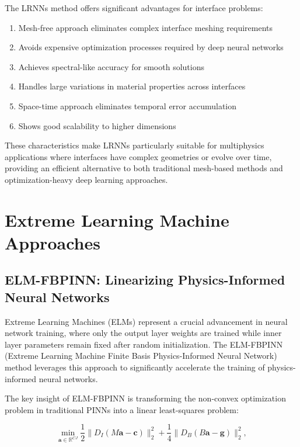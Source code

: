 \documentclass[11pt]{article}
\begin{document}
The LRNNs method offers significant advantages for interface problems:
\begin{enumerate}
    \item Mesh-free approach eliminates complex interface meshing requirements
    \item Avoids expensive optimization processes required by deep neural networks
    \item Achieves spectral-like accuracy for smooth solutions
    \item Handles large variations in material properties across interfaces
    \item Space-time approach eliminates temporal error accumulation
    \item Shows good scalability to higher dimensions
\end{enumerate}

These characteristics make LRNNs particularly suitable for multiphysics applications where interfaces have complex geometries or evolve over time, providing an efficient alternative to both traditional mesh-based methods and optimization-heavy deep learning approaches.

\section{Extreme Learning Machine Approaches}

\subsection{ELM-FBPINN: Linearizing Physics-Informed Neural Networks}

Extreme Learning Machines (ELMs) represent a crucial advancement in neural network training, where only the output layer weights are trained while inner layer parameters remain fixed after random initialization. The ELM-FBPINN (Extreme Learning Machine Finite Basis Physics-Informed Neural Network) method \citep{Anderson2023} leverages this approach to significantly accelerate the training of physics-informed neural networks.

The key insight of ELM-FBPINN is transforming the non-convex optimization problem in traditional PINNs into a linear least-squares problem:

\begin{equation}
    \min_{\mathbf{a} \in \mathbb{R}^{CJ}} \frac{1}{2} \|D_I(M\mathbf{a}-\mathbf{c})\|_2^2 + \frac{1}{4} \|D_B(B\mathbf{a}-\mathbf{g})\|_2^2,
\end{equation}
\end{document}

